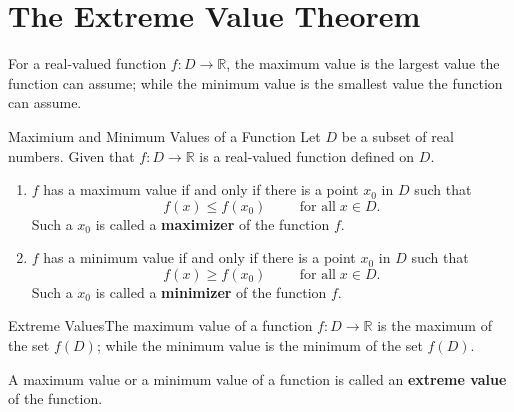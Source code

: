 \section{The Extreme Value Theorem}\label{sec2.3}
For a real-valued function $f:D\rightarrow\mathbb{R}$, the maximum value   is the largest  value the function can assume; while the minimum value  is the smallest value the function can assume.
\begin{definition}{Maximium and Minimum Values of a Function}
Let $D$  be a subset of real numbers. Given that $f:D\rightarrow\mathbb{R}$ is a  real-valued function  defined on $D$.
\begin{enumerate}[1.]
\item  $f$  has a maximum value if and only if there is a point $x_0$ in $D$ such that
\[f(x)\leq f(x_0)\hspace{1cm}\text{for all}\;x\in D.\]
Such a  $x_0$ is called a {\bf maximizer} of the function $f$.
\item  $f$  has a minimum value if and only if there is a point $x_0$ in $D$ such that
\[f(x)\geq f(x_0)\hspace{1cm}\text{for all}\;x\in D.\]
Such a  $x_0$ is called a {\bf minimizer} of the function $f$.
\end{enumerate}
\end{definition}

\begin{highlight}{Extreme Values}The maximum value of a function $f:D\rightarrow \mathbb{R}$ is the maximum of the set $f(D)$; while the minimum value is the minimum of the set $f(D)$.

A maximum value or a minimum value of a function  is called an {\bf extreme value} of the function. 
\end{highlight}

